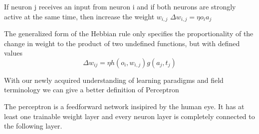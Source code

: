 \begin{definition}
    If neuron j receives an input from neuron i and if both neurons are strongly active at the same time, then increase the weight $w_{i,j}$
    $\Delta w_{i,j} = \eta o_i a_j$
\end{definition}
\begin{definition}
    The generalized form of the Hebbian rule only specifies the proportionality of the change in weight to the product of two undefined functions, but with defined values
    \[ 
        \Delta w_{ij} = \eta h(o_i,w_{i,j})g(a_j,t_j)
    \]
\end{definition}
With our newly acquired understanding of learning paradigms and field terminology we can give a better definition of Perceptron
\begin{definition}[Perceptron]
    The perceptron is a feedforward network insipired by the human eye. It has at least one trainable weight layer and every neuron layer is completely connected to the following layer.
\end{definition}
